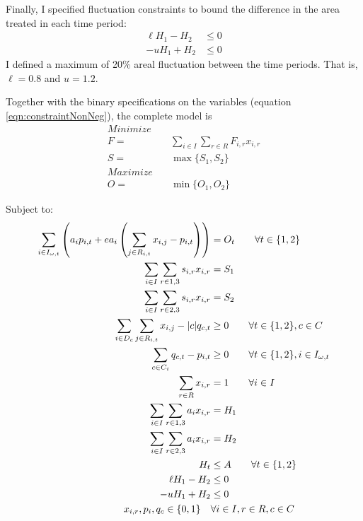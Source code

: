 Finally, I specified fluctuation constraints to bound the difference in the area treated in each time period:
\begin{align}
\ell H_1 - H_2 &\le 0 \label{eqn:constraintAreaFlucL}\\
-u H_1 + H_2 &\le 0 \label{eqn:constraintAreaFlucU}
\end{align}
I defined a maximum of 20\% areal fluctuation between the time periods. That is, $\ell = 0.8$ and $u = 1.2$.

Together with the binary specifications on the variables (equation \eqref{eqn:constraintNonNeg}), the complete model is
\begin{align*}
Minimize \quad & \\
F=&\sum_{i\in I}\sum_{r\in R} F_{i,r} x_{i,r}\\
S=&\max \{S_1,S_2\}\\
Maximize \quad & \\
O =&\min \{O_1,O_2\}
\end{align*}

Subject to:
\begin{align}
\sum_{i\in I_{\omega,t}} \left(a_i p_{i,t} + e a_i \left( \sum_{j \in R_{i,t}} x_{i,j}-p_{i,t} \right) \right) &= O_t \qquad \forall t \in \{1,2\} \notag\\
\sum_{i\in I} \sum_{r\in 1,3} s_{i,r} x_{i,r} &= S_1 \notag\\
\sum_{i\in I} \sum_{r\in 2,3} s_{i,r} x_{i,r} &= S_2 \notag\\
\sum_{i \in D_c} \sum_{j \in R_{i,t}} x_{i,j} - |c| q_{c,t} &\ge 0 \qquad \forall t \in \{1,2\}, c \in C \notag\\
\sum_{c \in C_i} q_{c,t} - p_{i,t} &\ge 0 \qquad \forall t \in \{1,2\}, i \in I_{\omega,t} \notag\\
\sum_{r \in R} x_{i,r} &= 1  \qquad \forall i \in I \notag\\
\sum_{i \in I} \sum_{r \in 1,3} a_i x_{i,r} &= H_1 \notag\\
\sum_{i \in I} \sum_{r \in 2,3} a_i x_{i,r} &= H_2 \notag\\
H_t &\le A \qquad \forall t \in \{1,2\} \notag\\
\ell H_1 - H_2 &\le 0 \notag\\
-u H_1 + H_2 &\le 0 \notag\\
x_{i,r}, p_i, q_c \in \{0,1\} \quad &\forall i \in I, r \in R, c \in C \label{eqn:constraintNonNeg}
\end{align}

